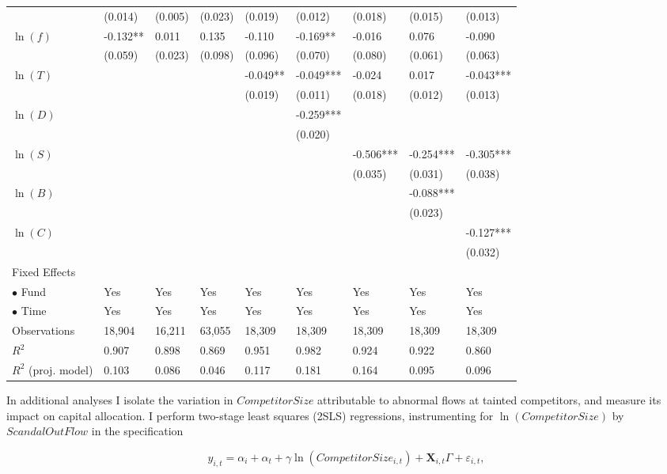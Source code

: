 \documentclass[openany]{book}
\theoremstyle{definition}
\theoremstyle{definition}
\theoremstyle{definition}
\theoremstyle{remark}
\begin{document}
\begin{table}[ht]
\begin{tabularx}{0.975\textwidth}{lYYYYYYYY}
   & (0.014) & (0.005) & (0.023) & (0.019) & (0.012) & (0.018) & (0.015) & (0.013) \\ 
  $\ln(f)$ & -0.132** & 0.011 & 0.135 & -0.110 & -0.169** & -0.016 & 0.076 & -0.090 \\ 
   & (0.059) & (0.023) & (0.098) & (0.096) & (0.070) & (0.080) & (0.061) & (0.063) \\ 
  $\ln(T)$ &  &  &  & -0.049** & -0.049*** & -0.024 & 0.017 & -0.043*** \\ 
   &  &  &  & (0.019) & (0.011) & (0.018) & (0.012) & (0.013) \\ 
  $\ln(D)$ &  &  &  &  & -0.259*** &  &  &  \\ 
   &  &  &  &  & (0.020) &  &  &  \\ 
  $\ln(S)$ &  &  &  &  &  & -0.506*** & -0.254*** & -0.305*** \\ 
   &  &  &  &  &  & (0.035) & (0.031) & (0.038) \\ 
  $\ln(B)$ &  &  &  &  &  &  & -0.088*** &  \\ 
   &  &  &  &  &  &  & (0.023) &  \\ 
  $\ln(C)$ &  &  &  &  &  &  &  & -0.127*** \\ 
   &  &  &  &  &  &  &  & (0.032) \\ 
  Fixed Effects &  &  &  &  &  &  &  &  \\ 
  $\bullet$ Fund & Yes & Yes & Yes & Yes & Yes & Yes & Yes & Yes \\ 
  $\bullet$ Time & Yes & Yes & Yes & Yes & Yes & Yes & Yes & Yes \\ 
  Observations & 18,904 & 16,211 & 63,055 & 18,309 & 18,309 & 18,309 & 18,309 & 18,309 \\ 
  $R^2$ & 0.907 & 0.898 & 0.869 & 0.951 & 0.982 & 0.924 & 0.922 & 0.860 \\ 
  $R^2$ (proj. model) & 0.103 & 0.086 & 0.046 & 0.117 & 0.181 & 0.164 & 0.095 & 0.096 \\ 
   \bottomrule
\end{tabularx}
\endgroup
\end{table}

In additional analyses I isolate the variation in \(CompetitorSize\)
attributable to abnormal flows at tainted competitors, and measure its
impact on capital allocation. I perform two-stage least squares (2SLS)
regressions, instrumenting for \(\ln(CompetitorSize)\) by
\(ScandalOutFlow\) in the specification

\begin{equation}
    y_{i,t}=\alpha_i+\alpha_t + \gamma \ln(CompetitorSize_{i,t}) + \mathbf{X}_{i,t}\Gamma+\varepsilon_{i,t},
\end{equation}
\end{document}
